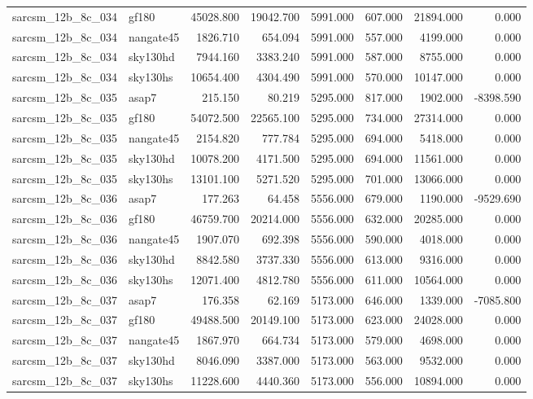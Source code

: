 \begin{tabular}{llrrrrrr}
sarcsm\_12b\_8c\_034 & gf180 & 45028.800 & 19042.700 & 5991.000 & 607.000 & 21894.000 & 0.000 \\
sarcsm\_12b\_8c\_034 & nangate45 & 1826.710 & 654.094 & 5991.000 & 557.000 & 4199.000 & 0.000 \\
sarcsm\_12b\_8c\_034 & sky130hd & 7944.160 & 3383.240 & 5991.000 & 587.000 & 8755.000 & 0.000 \\
sarcsm\_12b\_8c\_034 & sky130hs & 10654.400 & 4304.490 & 5991.000 & 570.000 & 10147.000 & 0.000 \\
sarcsm\_12b\_8c\_035 & asap7 & 215.150 & 80.219 & 5295.000 & 817.000 & 1902.000 & -8398.590 \\
sarcsm\_12b\_8c\_035 & gf180 & 54072.500 & 22565.100 & 5295.000 & 734.000 & 27314.000 & 0.000 \\
sarcsm\_12b\_8c\_035 & nangate45 & 2154.820 & 777.784 & 5295.000 & 694.000 & 5418.000 & 0.000 \\
sarcsm\_12b\_8c\_035 & sky130hd & 10078.200 & 4171.500 & 5295.000 & 694.000 & 11561.000 & 0.000 \\
sarcsm\_12b\_8c\_035 & sky130hs & 13101.100 & 5271.520 & 5295.000 & 701.000 & 13066.000 & 0.000 \\
sarcsm\_12b\_8c\_036 & asap7 & 177.263 & 64.458 & 5556.000 & 679.000 & 1190.000 & -9529.690 \\
sarcsm\_12b\_8c\_036 & gf180 & 46759.700 & 20214.000 & 5556.000 & 632.000 & 20285.000 & 0.000 \\
sarcsm\_12b\_8c\_036 & nangate45 & 1907.070 & 692.398 & 5556.000 & 590.000 & 4018.000 & 0.000 \\
sarcsm\_12b\_8c\_036 & sky130hd & 8842.580 & 3737.330 & 5556.000 & 613.000 & 9316.000 & 0.000 \\
sarcsm\_12b\_8c\_036 & sky130hs & 12071.400 & 4812.780 & 5556.000 & 611.000 & 10564.000 & 0.000 \\
sarcsm\_12b\_8c\_037 & asap7 & 176.358 & 62.169 & 5173.000 & 646.000 & 1339.000 & -7085.800 \\
sarcsm\_12b\_8c\_037 & gf180 & 49488.500 & 20149.100 & 5173.000 & 623.000 & 24028.000 & 0.000 \\
sarcsm\_12b\_8c\_037 & nangate45 & 1867.970 & 664.734 & 5173.000 & 579.000 & 4698.000 & 0.000 \\
sarcsm\_12b\_8c\_037 & sky130hd & 8046.090 & 3387.000 & 5173.000 & 563.000 & 9532.000 & 0.000 \\
sarcsm\_12b\_8c\_037 & sky130hs & 11228.600 & 4440.360 & 5173.000 & 556.000 & 10894.000 & 0.000 \\

\end{tabular}
